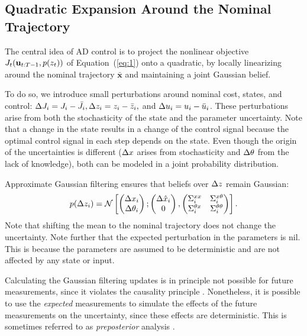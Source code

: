 \subsection{Quadratic Expansion Around the Nominal Trajectory}
\label{sec:quadr-expans-around}

The central idea of AD control is to project the nonlinear objective
$J_t(\mathbf{u}_{t:T-1}, p(z_t))$ of Equation~(\ref{eq:1}) onto a
quadratic, by locally linearizing around the nominal trajectory
$\bar{\mathbf{x}}$ and maintaining a joint Gaussian belief.

To do so, we introduce small perturbations around nominal cost, states, and
control: $\Delta J_i = J_i - \bar J_i, \Delta z_i = z_i - \bar z_i,$ and $\Delta u_i = u_i -
\bar u_i$.
These perturbations arise from both the stochasticity of the state and the
parameter uncertainty. Note that a change in the state results in a change of
the control signal because the optimal control signal in each step depends on
the state. Even though the origin of the uncertainties is different ($\Delta x$
arises from stochasticity and $\Delta \theta$ from the lack of knowledge), both can be
modeled in a joint probability distribution.

Approximate Gaussian filtering ensures that beliefs over $\Delta z$ remain Gaussian:
\begin{equation}
  \label{eq:6}
  p(\dz_\i) = \N\left[
    \begin{pmatrix}
      \dx_\i\\ \Delta \theta_\i
    \end{pmatrix};
    \begin{pmatrix}
      \Delta \hat{x}_\i \\ 0
    \end{pmatrix},
    \begin{pmatrix}
      \Sigma^{xx} _\i & \Sigma^{x\theta} _\i \\
      \Sigma^{\theta x} _\i & \Sigma^{\theta\theta} _\i \\
    \end{pmatrix} \right].
\end{equation}
Note that shifting the mean to the nominal trajectory does not change the
uncertainty. Note further that the expected perturbation in the parameters is
nil. This is because the parameters are assumed to be deterministic and are not
affected by any state or input.

Calculating the Gaussian filtering updates is in principle not possible for
future measurements, since it violates the causality principle
\cite[]{Glad.Ljung:2000:Control}. Nonetheless, it is possible to use the
\emph{expected} measurements to simulate the effects of the future measurements
on the uncertainty, since these effects are deterministic. This is sometimes
referred to as \emph{preposterior} analysis
\cite[\ts5A.3]{Raiffa.Schlaifer:1961:Applied}.

